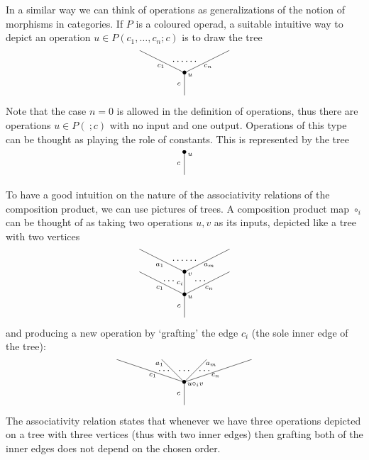 \documentclass[a4paper]{amsart}
\theoremstyle{plain}
\theoremstyle{definition}
\theoremstyle{remark}
\numberwithin{equation}{section}
\numberwithin{figure}{section}
\begin{document}
In a similar way we can think of operations as generalizations of the
notion of morphisms in categories. If $P$ is a coloured
operad, a suitable intuitive way to depict an operation
$u\in P(c_1,\ldots, c_n;c)$ is to draw the tree
$$
    \xy<0.08cm, 0cm>:
    (0,0)*{}="1";
    (0,10)*=0{\bullet}="2";
    (-20,20)*{}="3";
    (20,20)*{}="4";
    "1";"2" **\dir{-};
    "2";"3" **\dir{-};
    "2";"4" **\dir{-};
    (-2.5,5)*=0{\scriptstyle c};
    (-10.5, 13)*=0{\scriptstyle c_1};
    (10.5, 13)*=0{\scriptstyle c_n};
    (2.5, 9)*=0{\scriptstyle u};
    (0, 15)*=0{\cdots\cdots};
    \endxy
$$
Note that the case $n=0$ is allowed in the definition of operations,
thus there are operations $u\in P(\ ;c)$ with no input and one
output. Operations of this type can be thought as playing the role
of constants. This is represented by the tree
$$
    \xy<0.08cm, 0cm>:
    (0,0)*{}="1";
    (0,10)*=0{\bullet}="2";
    "1";"2" **\dir{-};
    (-2.5,5)*=0{\scriptstyle c};
    (2.5, 9)*=0{\scriptstyle u};
    \endxy
$$

To have a good intuition on the nature of the associativity
relations of the composition product, we can use pictures of trees.
A composition product map $\circ_i$ can be thought of as taking  two
operations $u, v$ as its inputs, depicted like a tree with two
vertices
$$
    \xy<0.08cm, 0cm>:
    (0,0)*{}="1";
    (0,10)*=0{\bullet}="2";
    (0,20)*=0{\bullet}="2a";
    (-20,20)*{}="3";
    (20,20)*{}="4";
    (-20,30)*{}="5";
    (20,30)*{}="6";
    "1";"2" **\dir{-};
    "2";"3" **\dir{-};
    "2";"4" **\dir{-};
    "2";"2a" **\dir{-};
    "2a";"5" **\dir{-};
    "2a";"6" **\dir{-};
    (-2.5,5)*=0{\scriptstyle c};
    (-11, 13)*=0{\scriptstyle c_1};
    (11, 13)*=0{\scriptstyle c_n};
    (2.5, 9)*=0{\scriptstyle u};
    (-2,15)*=0{\scriptstyle c_i};
    (-7, 16)*=0{\cdots};
    (7, 16)*=0{\cdots};
    (-11, 23)*=0{\scriptstyle a_1};
    (11, 23)*=0{\scriptstyle a_m};
    (2.5, 19)*=0{\scriptstyle v};
    (0, 25)*=0{\cdots\cdots};
    \endxy
$$
and producing a new operation by `grafting' the edge $c_i$ (the sole inner edge of the tree):
$$
    \xy<0.08cm, 0cm>:
    (0,0)*{}="1";
    (0,10)*=0{\bullet}="2";
    (-10,20)*{}="3";
    (10,20)*{}="4";
    (-30,20)*{}="5";
    (30,20)*{}="6";
    "1";"2" **\dir{-};
    "2";"3" **\dir{-};
    "2";"4" **\dir{-};
    "2";"5" **\dir{-};
    "2";"6" **\dir{-};
    (-2.5,5)*=0{\scriptstyle c};
    (-14, 13)*=0{\scriptstyle c_1};
    (12, 18)*=0{\scriptstyle a_m};
    (-11, 18)*=0{\scriptstyle a_1};
    (14, 13)*=0{\scriptstyle c_n};
    (5, 9)*=0{\scriptstyle u\circ_i v};
    (0, 15)*=0{\cdots};
    (9, 15)*=0{\cdots};
    (-9, 15)*=0{\cdots};
    \endxy
$$
The associativity relation states that whenever we have three operations depicted on a tree with three vertices (thus
with two inner edges) then grafting both of the inner edges does not depend on the chosen order.
\end{document}
